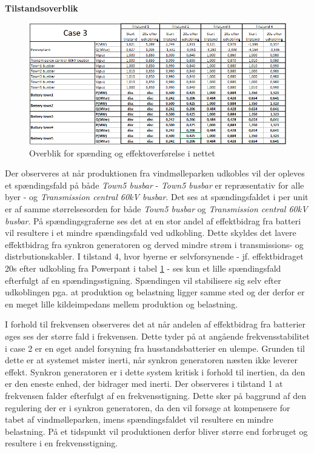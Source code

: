 \textbf{Tilstandsoverblik}
\begin{figure}[H] %
	\centering
	\includegraphics[width=1\textwidth]{figurer/LargeDisturbance/Overview}
	\caption{Overblik for spænding og effektoverførelse i nettet}
	\label{fig:C3Overview}
\end{figure}

Der observeres at når produktionen fra vindmølleparken udkobles vil der opleves et spændingsfald på både \textit{Town5 busbar} - \textit{Town5 busbar} er repræsentativ for alle byer - og \textit{Transmission central 60kV busbar}. Det ses at spændingsfaldet i per unit er af samme størrelsesorden for både \textit{Town5 busbar} og \textit{Transmission central 60kV busbar}. På spændingsgraferne ses det at en stor andel af effektbidrag fra batteri vil resultere i et mindre spændingsfald ved udkobling. Dette skyldes det lavere effektbidrag fra synkron generatoren og derved mindre strøm i transmissions- og distrbutionskabler. I tilstand 4, hvor byerne er selvforsynende - jf. effektbidraget 20s efter udkobling fra Powerpant i tabel \ref{fig:C3Overview} -  ses kun et lille spændingsfald efterfulgt af en spændingsstigning. Spændingen vil stabilisere sig selv efter udkoblingen pga. at produktion og belastning ligger samme sted og der derfor er en meget lille kildeimpedans mellem produktion og belastning.

I forhold til frekvensen observeres det at når andelen af effektbidrag fra batterier øges ses der større fald i frekvensen. Dette tyder på at angående frekvensstabilitet i case 2 er en øget andel forsyning fra husstandsbatterier en ulempe. Grunden til dette er at systemet mister inerti, når synkron generatoren næsten ikke leverer effekt. Synkron generatoren er i dette system kritisk i forhold til inertien, da den er den eneste enhed, der bidrager med inerti. Der observeres i tilstand 1 at frekvensen falder efterfulgt af en frekvensstigning. Dette sker på baggrund af den regulering der er i synkron generatoren, da den vil forsøge at kompensere for tabet af vindmølleparken, imens spændingsfaldet vil resultere en mindre belastning. På et tidspunkt vil produktionen derfor bliver større end forbruget og resultere i en frekvensstigning.